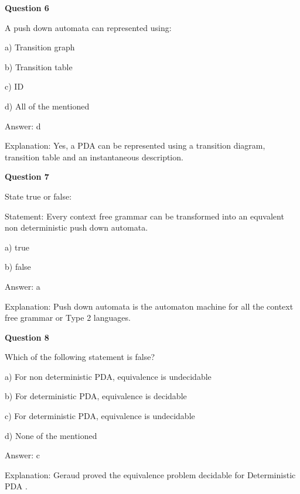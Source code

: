 \documentclass{article}
\begin{document}
\begin{mdframed}[linewidth=1pt, roundcorner=5pt, linecolor=gray!30, backgroundcolor=gray!5]
\textbf{Question 6} 

A push down automata  can represented using:

a) Transition graph

b) Transition table

c) ID

d) All of the mentioned
\vspace{5pt} \par
\begin{tcolorbox}[colback=green!5, colframe=green!40!black, title=Solution]
Answer: d

Explanation: Yes, a PDA can be represented using a transition diagram, transition table and an instantaneous description.
\end{tcolorbox}
\end{mdframed}

\begin{mdframed}[linewidth=1pt, roundcorner=5pt, linecolor=gray!30, backgroundcolor=gray!5]
\textbf{Question 7} 

State true or false:

Statement: Every context free grammar can be transformed into an equvalent non deterministic push down automata.

a) true

b) false
\vspace{5pt} \par
\begin{tcolorbox}[colback=green!5, colframe=green!40!black, title=Solution]
Answer: a

Explanation: Push down automata is the automaton machine for all the context free grammar or Type 2 languages.
\end{tcolorbox}
\end{mdframed}

\begin{mdframed}[linewidth=1pt, roundcorner=5pt, linecolor=gray!30, backgroundcolor=gray!5]
\textbf{Question 8} 

Which of the following statement is false?

a) For non deterministic PDA, equivalence is undecidable

b) For deterministic PDA, equivalence is decidable

c) For deterministic PDA, equivalence is undecidable

d) None of the mentioned
\vspace{5pt} \par
\begin{tcolorbox}[colback=green!5, colframe=green!40!black, title=Solution]
Answer: c

Explanation: Geraud proved the equivalence problem decidable for Deterministic PDA .
\end{tcolorbox}
\end{mdframed}
\newpage
\end{document}
